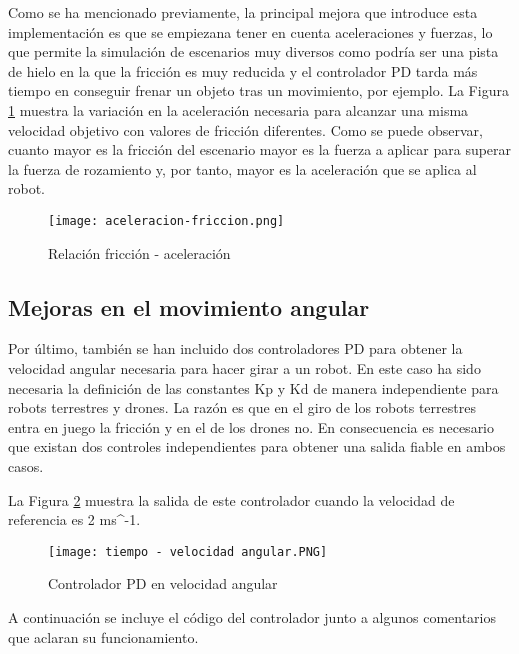 \normalsize
Como se ha mencionado previamente, la principal mejora que introduce esta implementación es que se empiezana  tener en cuenta aceleraciones y fuerzas, lo que permite la simulación de escenarios muy diversos como podría ser una pista de hielo en la que la fricción es muy reducida y el controlador PD tarda más tiempo en conseguir frenar un objeto tras un movimiento, por ejemplo. La Figura \ref{fig:friccion-acele} muestra la variación en la aceleración necesaria para alcanzar una misma velocidad objetivo con valores de fricción diferentes. Como se puede observar, cuanto mayor es la fricción del escenario mayor es la fuerza a aplicar para superar la fuerza de rozamiento y, por tanto, mayor es la aceleración que se aplica al robot.

\begin{figure}[h!]
    \centering
    \texttt{[image: aceleracion-friccion.png]}
    \caption{Relación fricción - aceleración}
    \label{fig:friccion-acele}
\end{figure}


\subsection{Mejoras en el movimiento angular}
Por último, también se han incluido dos controladores PD para obtener la velocidad angular necesaria para hacer girar a un robot. En este caso ha sido necesaria la definición de las constantes Kp y Kd de manera independiente para robots terrestres y drones. La razón es que en el giro de los robots terrestres entra en juego la fricción y en el de los drones no. En consecuencia es necesario que existan dos controles independientes para obtener una salida fiable en ambos casos. 

La Figura \ref{fig:pd_velang} muestra la salida de este controlador cuando la velocidad de referencia es 2 ms^{-1}.

\begin{figure}[h!]
    \centering
    \texttt{[image: tiempo - velocidad angular.PNG]}
    \caption{Controlador PD en velocidad angular}
    \label{fig:pd_velang}
\end{figure}

A continuación se incluye el código del controlador junto a algunos comentarios que aclaran su funcionamiento.

